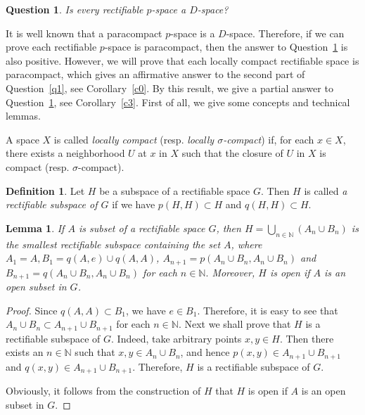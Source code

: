 \documentclass[psamsfonts,fceqn,leqno]{amsart}
\newtheorem{lemma}[theorem]{Lemma}
\newtheorem{question}[theorem]{Question}
\theoremstyle{definition}
\newtheorem{definition}[theorem]{Definition}
\begin{document}
\begin{question}\cite[Problem 5.10]{A2009}\label{q2}
Is every rectifiable $p$-space a $D$-space?
\end{question}

It is well known that a paracompact $p$-space is a $D$-space. Therefore, if we can prove each rectifiable $p$-space is paracompact, then the answer to Question~\ref{q2} is also positive. However, we will prove that each locally compact rectifiable space is paracompact, which gives
an affirmative answer to the second part of Question~\ref{q1}, see Corollary~\ref{c0}. By this result, we give a partial answer to Question~\ref{q2}, see Corollary~\ref{c3}. First of all, we give some concepts and technical lemmas.

A space $X$ is called {\it locally compact} (resp. {\it locally $\sigma$-compact}) if, for each $x\in X$, there exists a neighborhood $U$ at $x$ in $X$ such that the closure of $U$ in $X$ is  compact (resp. $\sigma$-compact).

\begin{definition}\cite{LLL}
Let $H$ be a subspace of a rectifiable space $G$. Then $H$ is called {\it a rectifiable subspace of $G$} if we have $p(H, H)\subset H$ and $q(H, H)\subset H$.
\end{definition}

\begin{lemma}\label{p0}
If $A$ is subset of a rectifiable space $G$, then $H=\bigcup_{n\in\mathbb{N}}(A_{n}\cup B_{n})$ is the smallest rectifiable subspace containing the set $A$, where $A_{1}=A, B_{1}=q(A, e)\cup q(A, A)$, $A_{n+1}=p(A_{n}\cup B_{n}, A_{n}\cup B_{n})$ and $B_{n+1}=q(A_{n}\cup B_{n}, A_{n}\cup B_{n})$ for each $n\in\mathbb{N}.$ Moreover, $H$ is open if $A$ is an open subset in $G$.
\end{lemma}

\begin{proof}
Since $q(A, A)\subset B_{1}$, we have $e\in B_{1}$. Therefore, it is easy to see that $A_{n}\cup B_{n}\subset A_{n+1}\cup B_{n+1}$ for each $n\in\mathbb{N}$. Next we shall prove that $H$ is a rectifiable subspace of $G$. Indeed, take arbitrary points $x, y\in H$. Then there exists an $n\in \mathbb{N}$ such that $x, y\in A_{n}\cup B_{n}$, and hence $p(x, y)\in A_{n+1}\cup B_{n+1}$ and $q(x, y)\in A_{n+1}\cup B_{n+1}$. Therefore, $H$ is a rectifiable subspace of $G$.

Obviously, it follows from the construction of $H$ that $H$ is open if $A$ is an open subset in $G$.
\end{proof}
\end{document}
